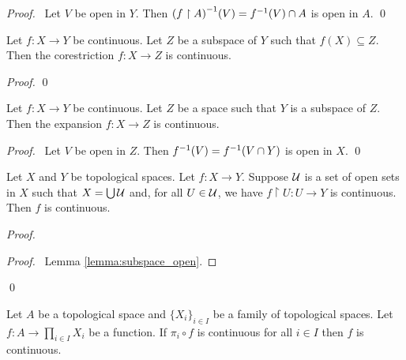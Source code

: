 \begin{proof}
    \pf\ Let $V$ be open in $Y$. Then ${(f \restriction A)}^{-1}(V) = {f}^{-1}(V) \cap A$ is open in $A$. \qed
\end{proof}

\begin{theorem}
    Let $f : X \rightarrow Y$ be continuous. Let $Z$ be a subspace of $Y$ such that $f(X) \subseteq Z$. Then
    the corestriction $f : X \rightarrow Z$ is continuous.
\end{theorem}

\begin{proof}
    \pf
    \qed
\end{proof}

\begin{theorem}
    Let $f : X \rightarrow Y$ be continuous. Let $Z$ be a space such that $Y$ is a subspace of $Z$.
    Then the expansion $f : X \rightarrow Z$ is continuous.
\end{theorem}

\begin{proof}
    \pf\ Let $V$ be open in $Z$. Then ${f}^{-1}(V) = {f}^{-1}(V \cap Y)$ is open in $X$. \qed
\end{proof}

\begin{theorem}
    Let $X$ and $Y$ be topological spaces. Let $f : X \rightarrow Y$. Suppose $\mathcal{U}$ is a set of open sets
    in $X$ such that $X = \bigcup \mathcal{U}$ and, for all $U \in \mathcal{U}$, we have $f \restriction U : U \rightarrow Y$
    is continuous. Then $f$ is continuous.
\end{theorem}

\begin{proof}
    \pf
    \begin{proof}
        \pf\ Lemma \ref{lemma:subspace_open}.
    \end{proof}
    \qed
\end{proof}

\begin{theorem}
    \label{theorem:product_continuous}
        Let $A$ be a topological space and $\{ X_i \}_{i \in I}$ be a family of topological spaces. Let $f : A \rightarrow \prod_{i \in I} X_i$ be a function.
        If $\pi_i \circ f$ is continuous for all $i \in I$ then $f$ is continuous.
\end{theorem}

